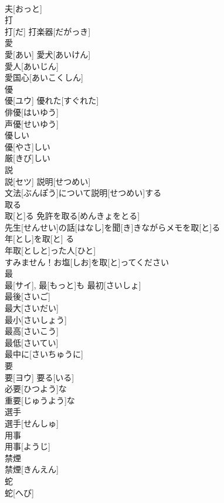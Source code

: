 \documentclass[8pt]{extreport}
\begin{document}
\begin{CJK}{UTF8}{min}
\\	夫[おっと]	
\\	打	
\\	打[だ]	打楽器[だがっき] 
\\	愛	
\\	愛[あい]	愛犬[あいけん] 
\\	愛人[あいじん] 
\\	愛国心[あいこくしん]　
\\	優	
\\	優[ユウ]	優れた[すぐれた] 
\\	俳優[はいゆう] 
\\	声優[せいゆう] 
\\	優しい	
\\	優[やさ]しい	
\\	厳[きび]しい 
\\	説	
\\	説[セツ]	説明[せつめい] 
\\	文法[ぶんぽう]について説明[せつめい]する 
\\	取る	
\\	取[と]る	免許を取る[めんきょをとる] 
\\	先生[せんせい]の話[はなし]を聞[き]きながらメモを取[と]る 
\\	年[とし]を取[と] る 
\\	年取[としと]った人[ひと] 
\\	すみません！お塩[しお]を取[と]ってください 
\\	最	
\\	最[サイ], 最[もっと]も	最初[さいしょ] 
\\	最後[さいご] 
\\	最大[さいだい] 
\\	最小[さいしょう] 
\\	最高[さいこう] 
\\	最低[さいてい] 
\\	最中に[さいちゅうに] 
\\	要	
\\	要[ヨウ]	要る[いる] 
\\	必要[ひつよう]な 
\\	重要[じゅうよう]な 
\\	選手	
\\	選手[せんしゅ]	
\\	用事	
\\	用事[ようじ]	
\\	禁煙	
\\	禁煙[きんえん]	
\\	蛇	
\\	蛇[へび]	

\end{CJK}
\end{document}
